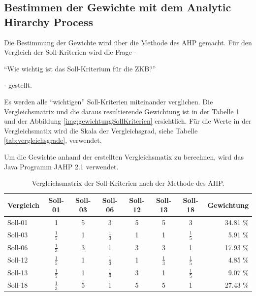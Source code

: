   \subsection{Bestimmen der Gewichte mit dem Analytic Hirarchy Process}
  
  Die Bestimmung der Gewichte wird über die Methode des \ac{AHP} gemacht. Für
  den Vergleich der Soll-Kriterien wird die Frage - \begin{itshape}``Wie
  wichtig ist das Soll-Kriterium für die \ac{ZKB}?''\end{itshape} - gestellt.
  
  Es werden alle ``wichtigen'' Soll-Kriterien miteinander verglichen. Die
  Vergleichsmatrix und die daraus resultierende Gewichtung ist in der Tabelle
  \ref{tab:gewichtungDerSollKriterien} und der Abbildung
  \ref{img:gewichtungSollKriterien} ersichtlich. Für die Werte in der
  Vergleichsmatix wird die Skala der Vergleichsgrad, siehe Tabelle
  \ref{tab:vergleichsgrade}, verwendet.
  
  Um die Gewichte anhand der erstellten Vergleichsmatix zu berechnen, wird das
  Java Programm JAHP 2.1 verwendet.
  
  \begin{table}[!h]
    \sffamily 
    \begin{center}
      \begin{tabular}{l|cccccc|r}
        \toprule
        Vergleich & Soll-01 & Soll-03 & Soll-06 & Soll-12 & Soll-13 & Soll-18
        & Gewichtung\\
        \midrule
        Soll-01 & 1 & 5 & 3 & 5 & 5 & 3 & 34.81 \%\\
        Soll-03 & $\frac{1}{5}$ & 1 & $\frac{1}{3}$ & 1 & 1 & $\frac{1}{5}$ &
        5.91 \%\\
        Soll-06 & $\frac{1}{3}$ & 3 & 1 & 3 & 3 & 1 & 17.93 \%\\
        Soll-12 & $\frac{1}{5}$ & 1 & $\frac{1}{3}$ & 1 & $\frac{1}{3}$ &
        $\frac{1}{5}$ & 4.85 \% \\
        Soll-13 & $\frac{1}{5}$ & 1 & $\frac{1}{3}$ & 3 & 1 & $\frac{1}{5}$ &
        9.07 \%\\ Soll-18 & $\frac{1}{3}$ & 5 & 1 & 5 & 5 & 1 & 27.43 \%\\
        \bottomrule
      \end{tabular}
      \caption{Vergleichsmatrix der Soll-Kriterien nach der Methode des AHP.}
      \label{tab:gewichtungDerSollKriterien}
    \end{center}
  \end{table}
  
